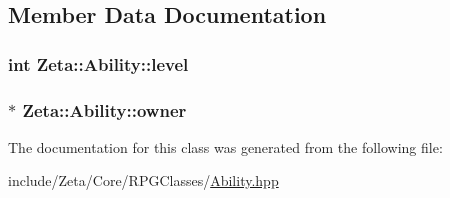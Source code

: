 \subsection{Member Data Documentation}
\hypertarget{classZeta_1_1Ability_a41d29a6fb79dd19a7eed5f6a4be5de9a}{
\subsubsection[{level}]{\setlength{\rightskip}{0pt plus 5cm}int Zeta\+::\+Ability\+::level\hspace{0.3cm}{\ttfamily [protected]}}}\label{classZeta_1_1Ability_a41d29a6fb79dd19a7eed5f6a4be5de9a}
\hypertarget{classZeta_1_1Ability_ad37bed67f04178297d6fe4c9a2ed619a}{
\subsubsection[{owner}]{$\ast$ Zeta\+::\+Ability\+::owner\hspace{0.3cm}{\ttfamily [protected]}}}\label{classZeta_1_1Ability_ad37bed67f04178297d6fe4c9a2ed619a}


The documentation for this class was generated from the following file\+:\begin{DoxyCompactItemize}
\item 
include/\+Zeta/\+Core/\+R\+P\+G\+Classes/\hyperlink{Ability_8hpp}{Ability.\+hpp}\end{DoxyCompactItemize}
